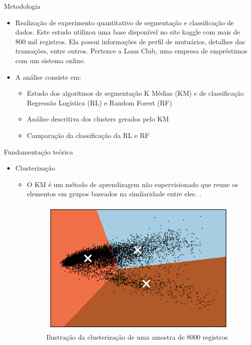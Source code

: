 \documentclass[final,hyperref={pdfpagelabels=false, brazil}]{beamer}
\let\olditem=\item%
\renewcommand{\item}{\olditem \justifying}%
\begin{document}
\begin{frame}[t]
\begin{columns}[t]
\begin{column}{.465\textwidth}

\begin{block}{Metodologia}


\begin{itemize}
\item Realização de experimento quantitativo de segmentação e classificação de dados. Este estudo utilizou uma base disponível no site kaggle\cite{KAGGLE} com mais de 800 mil registros. Ela possui informações de perfil de mutuários, detalhes das transações, entre outros. Pertence a Loan Club, uma empresa de empréstimos com um sistema online.

\item A análise consiste em:
\begin{itemize}
\item Estudo dos algoritmos de segmentação K Médias (KM) e de classificação Regressão Logística (RL) e Random Forest (RF)
\item Análise descritiva dos clusters gerados pelo KM
\item Comparação da classificação da RL e RF
\end{itemize}
\end{itemize}

\end{block}


\begin{block}{Fundamenta\c c\~ao te\'orica}

\begin{itemize}
\item Clusterização
\begin{itemize}
\item O KM é um método de aprendizagem não supervisionado que reune os elementos em grupos baseados na similaridade entre eles.  \cite{MacQueen}. 

\begin{figure}
\centering
\caption{Ilustração da clusterização de uma amostra de 8000 registros}
\includegraphics[width=0.65\linewidth]{cluster.png}
\end{figure}


\end{itemize}
\end{itemize}
\end{block}
\end{column}
\end{columns}
\end{frame}
\end{document}
